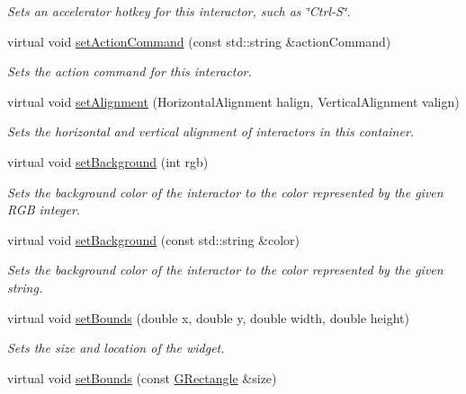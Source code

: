 \begin{DoxyCompactItemize}
\begin{DoxyCompactList}\small\item\em Sets an accelerator hotkey for this interactor, such as \char`\"{}\+Ctrl-\/\+S\char`\"{}. \end{DoxyCompactList}\item 
virtual void \mbox{\hyperlink{classGInteractor_a4b5843fe3030e038a1ba54cc03389bcf}{set\+Action\+Command}} (const std\+::string \&action\+Command)
\begin{DoxyCompactList}\small\item\em Sets the action command for this interactor. \end{DoxyCompactList}\item 
virtual void \mbox{\hyperlink{classGContainer_a0bcf8805d87afc9bb4c6ca238ca7c0bd}{set\+Alignment}} (Horizontal\+Alignment halign, Vertical\+Alignment valign)
\begin{DoxyCompactList}\small\item\em Sets the horizontal and vertical alignment of interactors in this container. \end{DoxyCompactList}\item 
virtual void \mbox{\hyperlink{classGInteractor_acba7e546c2025c0a15ca4b4cc92043db}{set\+Background}} (int rgb)
\begin{DoxyCompactList}\small\item\em Sets the background color of the interactor to the color represented by the given R\+GB integer. \end{DoxyCompactList}\item 
virtual void \mbox{\hyperlink{classGInteractor_ab4677ab2474e68b07aa56605af92a84a}{set\+Background}} (const std\+::string \&color)
\begin{DoxyCompactList}\small\item\em Sets the background color of the interactor to the color represented by the given string. \end{DoxyCompactList}\item 
virtual void \mbox{\hyperlink{classGInteractor_a2aae8197624b72265ab83b4f1bc73f2f}{set\+Bounds}} (double x, double y, double width, double height)
\begin{DoxyCompactList}\small\item\em Sets the size and location of the widget. \end{DoxyCompactList}\item 
virtual void \mbox{\hyperlink{classGInteractor_acada386653f008cacc7cce86426bef7c}{set\+Bounds}} (const \mbox{\hyperlink{classGRectangle}{G\+Rectangle}} \&size)

\end{DoxyCompactItemize}
